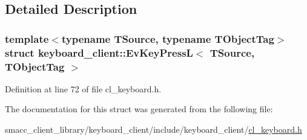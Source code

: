 \subsection{Detailed Description}
\subsubsection*{template$<$typename T\+Source, typename T\+Object\+Tag$>$\newline
struct keyboard\+\_\+client\+::\+Ev\+Key\+Press\+L$<$ T\+Source, T\+Object\+Tag $>$}



Definition at line 72 of file cl\+\_\+keyboard.\+h.



The documentation for this struct was generated from the following file\+:\begin{DoxyCompactItemize}
\item 
smacc\+\_\+client\+\_\+library/keyboard\+\_\+client/include/keyboard\+\_\+client/\hyperlink{cl__keyboard_8h}{cl\+\_\+keyboard.\+h}\end{DoxyCompactItemize}
